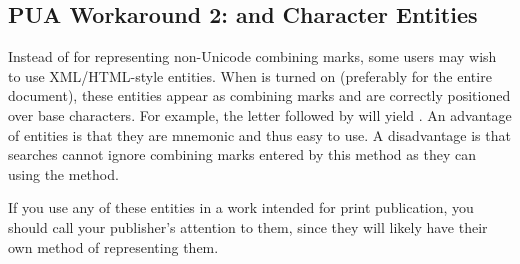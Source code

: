 \subsection{PUA Workaround 2:  and Character Entities}\hypertarget{ss10}{}
Instead of  for representing non-Unicode combining marks, some users may
wish to use XML/HTML-style entities. When  is turned on (preferably for the entire
document), these entities appear as combining marks and are correctly positioned over base characters.
For example, the letter  followed by
 will yield . An advantage of entities is that
they are mnemonic and thus easy to use. A disadvantage is that
searches cannot ignore combining marks entered by this method as they can using the  method.

If you use any of these entities in a work intended for print publication, you should call your publisher’s
attention to them, since they will likely have their own method of representing them.

